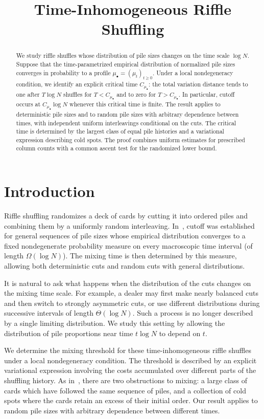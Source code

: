 \documentclass[11pt]{article}
\title{Time-Inhomogeneous Riffle Shuffling}
\author{}
\date{}
\makeatletter
\numberwithin{equation}{section}
\theoremstyle{definition}
\theoremstyle{remark}
\newcommand{\1}{\mathbf 1}
\renewcommand{\maketitle}{\begin{center}{\LARGE\@title\par}\end{center}\vspace{1em}}
\makeatother
\begin{document}
\maketitle
\begin{abstract}
We study riffle shuffles whose distribution of pile sizes changes on the
time scale $\log N$. Suppose that the time-parametrized empirical
distribution of normalized pile sizes converges in probability to a
profile $\mu_\bullet=(\mu_t)_{t\ge0}$. Under a local nondegeneracy
condition, we identify an explicit critical time $C_{\mu_\bullet}$:
the total variation distance tends to one after $T\log N$ shuffles
for $T<C_{\mu_\bullet}$ and to zero for $T>C_{\mu_\bullet}$.
In particular, cutoff occurs at $C_{\mu_\bullet}\log N$ whenever
this critical time is finite. The result applies to deterministic
pile sizes and to random pile sizes with arbitrary dependence
between times, with independent uniform interleavings conditional
on the cuts. The critical time is determined by the largest class
of equal pile histories and a variational expression describing
cold spots. The proof combines uniform estimates for prescribed
column counts with a common ascent test for the randomized lower bound.
\end{abstract}

\section{Introduction}

Riffle shuffling randomizes a deck of cards by cutting it into ordered
piles and combining them by a uniformly random interleaving. In~\cite{SSW},
cutoff was established for general sequences of pile sizes whose empirical
distribution converges to a fixed nondegenerate probability measure on
every macroscopic time interval (of length $\Omega(\log N)$). The mixing
time is then determined by this measure, allowing both deterministic cuts
and random cuts with general distributions.

It is natural to ask what happens when the distribution of the cuts
changes on the mixing time scale. For example, a dealer may first make
nearly balanced cuts and then switch to strongly asymmetric cuts, or use
different distributions during successive intervals of length
$\Theta(\log N)$. Such a process is no longer described by a single
limiting distribution. We study this setting by allowing the distribution
of pile proportions near time $t\log N$ to depend on $t$.

We determine the mixing threshold for these time-inhomogeneous riffle
shuffles under a local nondegeneracy condition. The threshold is described
by an explicit variational expression involving the costs accumulated
over different parts of the shuffling history. As in~\cite{SSW}, there
are two obstructions to mixing: a large class of cards which have followed
the same sequence of piles, and a collection of cold spots where the
cards retain an excess of their initial order. Our result applies to
random pile sizes with arbitrary dependence between different times.
\end{document}
